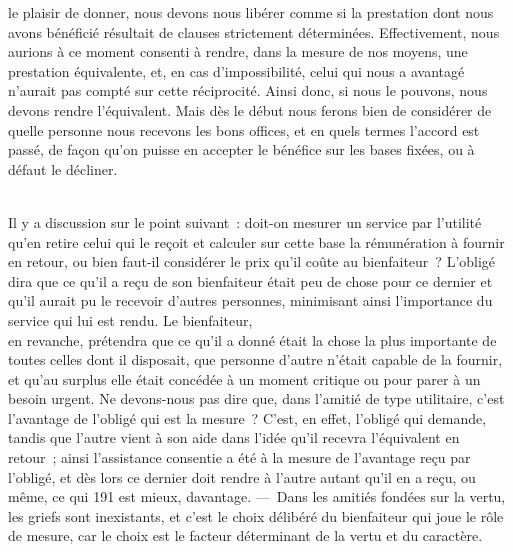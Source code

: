 \documentclass[french,twoside]{book} %
\begin{document}
le plaisir de donner, nous devons nous libérer comme si la prestation dont nous avons bénéficié résultait de clauses strictement déterminées. Effectivement, nous aurions à ce moment consenti à rendre, dans la mesure de nos moyens, une prestation équivalente, et, en cas d’impossibilité, celui qui nous a avantagé n’aurait pas compté sur cette réciprocité. Ainsi donc, si nous le pouvons, nous devons rendre l’équivalent. Mais dès le début nous ferons bien de considérer de quelle personne nous recevons les bons offices, et en quels termes l’accord est passé, de façon qu’on puisse en accepter le bénéfice sur les bases fixées, ou à défaut le décliner.\par
\\
Il y a discussion sur le point suivant : doit-on mesurer un service par l’utilité qu’en retire celui qui le reçoit et calculer sur cette base la rémunération à fournir en retour, ou bien faut-il considérer le prix qu’il coûte au bienfaiteur ? L’obligé dira que ce qu’il a reçu de son bienfaiteur était peu de chose pour ce dernier et qu’il aurait pu le recevoir d’autres personnes, minimisant ainsi l’importance du service qui lui est rendu. Le bienfaiteur, \\
en revanche, prétendra que ce qu’il a donné était la chose la plus importante de toutes celles dont il disposait, que personne d’autre n’était capable de la fournir, et qu’au surplus elle était concédée à un moment critique ou pour parer à un besoin urgent. Ne devons-nous pas dire que, dans l’amitié de type utilitaire, c’est l’avantage de l’obligé qui est la mesure ? C’est, en effet, l’obligé qui demande, tandis que l’autre vient à son aide dans l’idée qu’il recevra l’équivalent en retour ; ainsi l’assistance consentie a été à la mesure de l’avantage reçu par \\
l’obligé, et dès lors ce dernier doit rendre à l’autre autant qu’il en a reçu, ou même, ce qui 191 est mieux, davantage. — Dans les amitiés fondées sur la vertu, les griefs sont inexistants, et c’est le choix délibéré du bienfaiteur qui joue le rôle de mesure, car le choix est le facteur déterminant de la vertu et du caractère.
\end{document}
